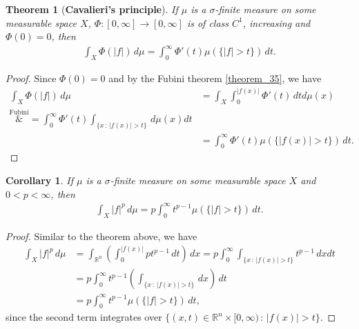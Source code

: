 \documentclass[11pt]{book}
\newtheorem{theorem}{Theorem}[chapter]
\newtheorem{corollary}{Corollary}[theorem]
\theoremstyle{definition}
\numberwithin{equation}{chapter}
\begin{document}
\begin{theorem}[{\bf Cavalieri's principle}]
If $\mu$ is a $\sigma$-finite measure on some measurable space $X$, $\Phi: [0,\infty] \to [0,\infty]$ is of class $C^1$, increasing and $\Phi(0) = 0$, then 
\begin{align*}
    \int_X \Phi(\left|f\right|) \,d\mu = \int^\infty_0 \Phi'(t) \mu(\{\left|f\right| > t \}) \,dt.
\end{align*}
\end{theorem}
\begin{proof}
Since $\Phi(0) = 0$ and by the Fubini theorem \ref{theorem_35}, we have
\begin{align*}
    \int_X \Phi(\left|f\right|) \,d\mu & = \int_X \int^{\left|f(x)\right|}_0 \Phi'(t) \,dtd\mu(x) \\
    \overset{\text{Fubini}}&{=} \int^\infty_0 \Phi'(t) \int_{\{x\,:\,\left|f(x)\right| > t\}} \, d\mu(x) dt \\
    & = \int^\infty_0 \Phi'(t) \mu(\{\left|f(x)\right| > t\}) \, dt.
\end{align*}
\end{proof}

\medskip

\begin{corollary}\label{corollary_661}
If $\mu$ is a $\sigma$-finite measure on some measurable space $X$ and $0 < p < \infty$, then
\begin{align*}
    \int_X \left|f\right|^p \,d\mu = p \int^\infty_0 t^{p-1} \mu(\{\left|f\right| > t\}) \,dt.
\end{align*}
\end{corollary}
\begin{proof}
Similar to the theorem above, we have
\begin{align*}
    \int_X \left|f\right|^p \,d\mu & = \int_{\mathbb{R}^n} \left(\int^{\left|f(x)\right|}_0 p t^{p-1} \,dt\right) \,dx = p \int^\infty_0 \int_{\{x\,:\,\left|f(x)\right| > t\}} t^{p-1} \,dxdt \\
    & = p \int^\infty_0 t^{p-1} \left(\int_{\{x\,:\,\left|f(x)\right| > t\}} \,dx\right) \,dt \\
    & = p \int^\infty_0 t^{p-1} \mu(\{\left|f\right| > t\}) \,dt,
\end{align*}
since the second term integrates over $\{(x,t) \in \mathbb{R}^n \times [0,\infty) \,:\, \left|f(x)\right| > t\}$.
\end{proof}

\medskip
\end{document}
